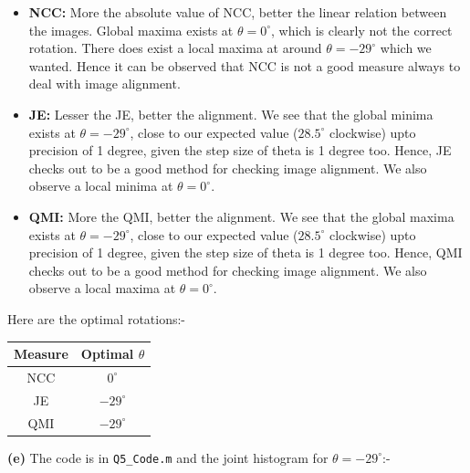 \documentclass[12pt]{article}
\begin{document}
    \begin{itemize}[itemsep=0em]
        \item \textbf{NCC:} More the absolute value of NCC, better the linear relation between the images. Global maxima exists at $\theta = 0^{\circ}$, which is clearly not the correct rotation. There does exist a local maxima at around $\theta = -29^{\circ}$ which we wanted. Hence it can be observed that NCC is not a good measure always to deal with image alignment.
        \item \textbf{JE:} Lesser the JE, better the alignment. We see that the global minima exists at $\theta = -29^{\circ}$, close to our expected value ($28.5^{\circ}$ clockwise) upto precision of 1 degree, given the step size of theta is 1 degree too. Hence, JE checks out to be a good method for checking image alignment. We also observe a local minima at $\theta = 0^{\circ}$.
        \item \textbf{QMI:} More the QMI, better the alignment. We see that the global maxima exists at $\theta = -29^{\circ}$, close to our expected value ($28.5^{\circ}$ clockwise) upto precision of 1 degree, given the step size of theta is 1 degree too. Hence, QMI checks out to be a good method for checking image alignment. We also observe a local maxima at $\theta = 0^{\circ}$.
    \end{itemize}
    
    \vspace{-10pt}
    
    Here are the optimal rotations:-
    
    \vspace{-10pt}
    
    \begin{table}[H]
        \centering
        \begin{tabular}{|c|c|}
            \hline
            Measure & Optimal $\theta$ \\
            \hline
            NCC & $0^{\circ}$ \\
            JE & $-29^{\circ}$ \\
            QMI & $-29^{\circ}$ \\
            \hline
        \end{tabular}
    \end{table}
    
    \vspace{-10pt}
    
    \textbf{(e)} The code is in \texttt{Q5\_Code.m} and the joint histogram for $\theta = -29^{\circ}$:-
    
\end{document}

